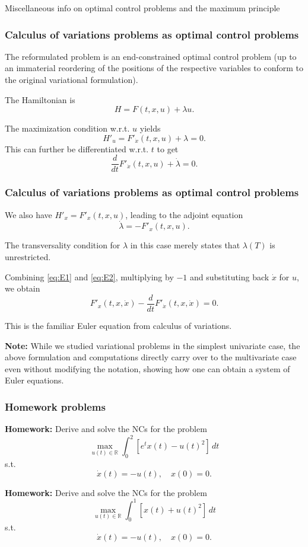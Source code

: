 \documentclass[10pt]{beamer}
\theoremstyle{definition}
\begin{document}
\begin{section}{Miscellaneous info on optimal control problems and the maximum principle}
\begin{frame}[fragile]
\frametitle{Calculus of variations problems as optimal control problems}
The reformulated problem is an end-constrained optimal control problem (up to an immaterial reordering of the positions of the respective variables to conform to the original variational formulation).

The Hamiltonian is \[ H=F(t,x,u)+\lambda u. \]

The maximization condition w.r.t. $ u $ yields \[ H'_u = F'_{\dot{x}}(t,x,u)+\lambda = 0. \]
This can further be differentiated w.r.t. $ t $ to get \begin{equation}\label{eq:E1}
\frac{d}{dt}F'_{\dot{x}}(t,x,u)+\dot{\lambda} = 0.\tag{$ \star $}
\end{equation} 
\end{frame}

\begin{frame}[fragile]
\frametitle{Calculus of variations problems as optimal control problems}
We also have $ H'_x = F'_x(t,x,u) $, leading to the adjoint equation \begin{equation}\label{eq:E2}
\dot{\lambda} = -F'_x(t,x,u).\tag{$ \star \star$}
\end{equation}  

The transversality condition for $ \lambda $ in this case merely states that $ \lambda(T) $ is unrestricted.

Combining \eqref{eq:E1} and \eqref{eq:E2}, multiplying by $ -1 $ and substituting back $ \dot{x} $ for $ u $, we obtain \[ F'_x(t,x,\dot{x})-\frac{d}{dt}F'_{\dot{x}}(t,x,\dot{x}) = 0. \]

This is the familiar Euler equation from calculus of variations.\bigskip

\textbf{Note:} While we studied variational problems in the simplest univariate case, the above formulation and computations directly carry over to the multivariate case even without modifying the notation, showing how one can obtain a system of Euler equations.
\end{frame}

\end{section}


\begin{frame}[fragile]
\frametitle{Homework problems}
\textbf{Homework:} Derive and solve the NCs for the problem \[ \max_{u(t)\in \mathbb{R}}\int_{0}^{2}[e^t x(t)-u(t)^2]\,dt \] s.t. \[ \dot{x}(t)=-u(t),\quad x(0) = 0. \] \bigskip

\textbf{Homework:} Derive and solve the NCs for the problem \[ \max_{u(t)\in \mathbb{R}}\int_{0}^{1}[x(t)+u(t)^2]\,dt \] s.t. \[ \dot{x}(t)=-u(t),\quad x(0) = 0. \]
\end{frame}
\end{document}
